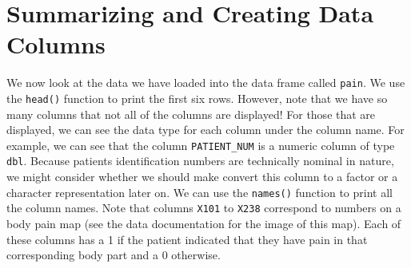 \documentclass[
  letterpaper,
]{latex/krantz}
\begin{document}
\section{Summarizing and Creating Data
Columns}\label{summarizing-and-creating-data-columns}

We now look at the data we have loaded into the data frame called
\texttt{pain}. We use the
\texttt{head()} function to
print the first six rows. However, note that we have so many columns
that not all of the columns are displayed! For those that are displayed,
we can see the data type for each column under the column name. For
example, we can see that the column \texttt{PATIENT\_NUM} is a numeric
column of type \texttt{dbl}. Because patients identification numbers are
technically nominal in nature, we might consider whether we should make
convert this column to a factor or a character representation later on.
We can use the
\texttt{names()} function to
print all the column names. Note that columns \texttt{X101} to
\texttt{X238} correspond to numbers on a body pain map (see the data
documentation for the image of this map). Each of these columns has a 1
if the patient indicated that they have pain in that corresponding body
part and a 0 otherwise.
\end{document}
